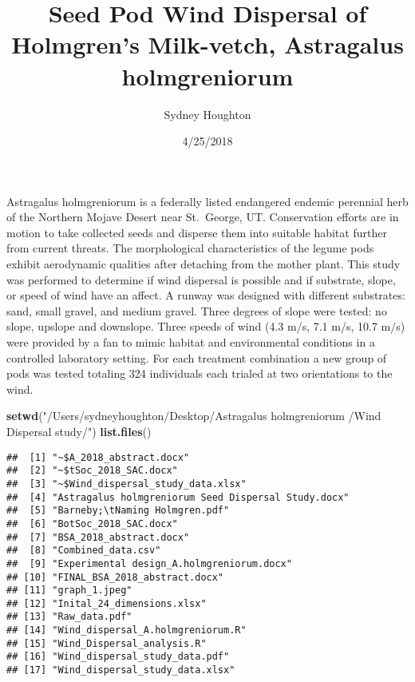 \documentclass[]{article}
\title{Seed Pod Wind Dispersal of Holmgren's Milk-vetch, Astragalus
holmgreniorum}
\author{Sydney Houghton}
\date{4/25/2018}
\newenvironment{Shaded}{\begin{snugshade}}{\end{snugshade}}
\newcommand{\KeywordTok}[1]{\textcolor[rgb]{0.13,0.29,0.53}{\textbf{#1}}}
\newcommand{\NormalTok}[1]{#1}
\newcommand{\StringTok}[1]{\textcolor[rgb]{0.31,0.60,0.02}{#1}}
\begin{document}
\maketitle

Astragalus holmgreniorum is a federally listed endangered endemic
perennial herb of the Northern Mojave Desert near St.~George, UT.
Conservation efforts are in motion to take collected seeds and disperse
them into suitable habitat further from current threats. The
morphological characteristics of the legume pods exhibit aerodynamic
qualities after detaching from the mother plant. This study was
performed to determine if wind dispersal is possible and if substrate,
slope, or speed of wind have an affect. A runway was designed with
different substrates: sand, small gravel, and medium gravel. Three
degrees of slope were tested: no slope, upslope and downslope. Three
speeds of wind (4.3 m/s, 7.1 m/s, 10.7 m/s) were provided by a fan to
mimic habitat and environmental conditions in a controlled laboratory
setting. For each treatment combination a new group of pods was tested
totaling 324 individuals each trialed at two orientations to the wind.

\begin{Shaded}
\begin{Highlighting}[]
\KeywordTok{setwd}\NormalTok{(}\StringTok{"/Users/sydneyhoughton/Desktop/Astragalus holmgreniorum /Wind Dispersal study/"}\NormalTok{)}
\KeywordTok{list.files}\NormalTok{()}
\end{Highlighting}
\end{Shaded}

\begin{verbatim}
##  [1] "~$A_2018_abstract.docx"                            
##  [2] "~$tSoc_2018_SAC.docx"                              
##  [3] "~$Wind_dispersal_study_data.xlsx"                  
##  [4] "Astragalus holmgreniorum Seed Dispersal Study.docx"
##  [5] "Barneby;\tNaming Holmgren.pdf"                     
##  [6] "BotSoc_2018_SAC.docx"                              
##  [7] "BSA_2018_abstract.docx"                            
##  [8] "Combined_data.csv"                                 
##  [9] "Experimental design_A.holmgreniorum.docx"          
## [10] "FINAL_BSA_2018_abstract.docx"                      
## [11] "graph_1.jpeg"                                      
## [12] "Inital_24_dimensions.xlsx"                         
## [13] "Raw_data.pdf"                                      
## [14] "Wind_dispersal_A.holmgreniorum.R"                  
## [15] "Wind_Dispersal_analysis.R"                         
## [16] "Wind_dispersal_study_data.pdf"                     
## [17] "Wind_dispersal_study_data.xlsx"
\end{verbatim}
\end{document}
